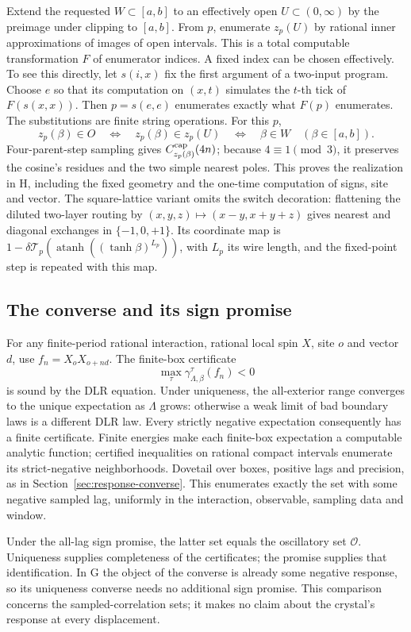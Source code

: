 Extend the requested \(W\subset[a,b]\) to an effectively open \(U\subset(0,\infty)\) by the preimage under clipping to \([a,b]\). From \(p\), enumerate \(z_p(U)\) by rational inner approximations of images of open intervals. This is a total computable transformation \(F\) of enumerator indices. A fixed index can be chosen effectively. To see this directly, let \(s(i,x)\) fix the first argument of a two-input program. Choose \(e\) so that its computation on \((x,t)\) simulates the \(t\)-th tick of \(F(s(x,x))\). Then \(p=s(e,e)\) enumerates exactly what \(F(p)\) enumerates. The substitutions are finite string operations. For this \(p\),
\[
 z_p(\beta)\in O\quad\Longleftrightarrow\quad
 z_p(\beta)\in z_p(U)\quad\Longleftrightarrow\quad\beta\in W
 \quad(\beta\in[a,b]).
\]
Four-parent-step sampling gives \(C^{\rm cap}_{z_p(\beta)}(4n)\); because \(4\equiv1\pmod3\), it preserves the cosine's residues and the two simple nearest poles. This proves the realization in H, including the fixed geometry and the one-time computation of signs, site and vector. The square-lattice variant omits the switch decoration: flattening the diluted two-layer routing by \((x,y,z)\mapsto(x-y,x+y+z)\) gives nearest and diagonal exchanges in \(\{-1,0,+1\}\). Its coordinate map is \(1-\delta\mathcal T_p(\operatorname{atanh}((\tanh\beta)^{L_p}))\), with \(L_p\) its wire length, and the fixed-point step is repeated with this map.

\subsection{The converse and its sign promise}\label{sec:decay-converse}

For any finite-period rational interaction, rational local spin \(X\), site \(o\) and vector \(d\), use
\(f_n=X_oX_{o+nd}\). The finite-box certificate
\[
 \max_\tau\gamma_{\Lambda,\beta}^\tau(f_n)<0
\]
is sound by the DLR equation. Under uniqueness, the all-exterior range converges to the unique expectation as \(\Lambda\) grows: otherwise a weak limit of bad boundary laws is a different DLR law. Every strictly negative expectation consequently has a finite certificate. Finite energies make each finite-box expectation a computable analytic function; certified inequalities on rational compact intervals enumerate its strict-negative neighborhoods. Dovetail over boxes, positive lags and precision, as in Section~\ref{sec:response-converse}. This enumerates exactly the set with some negative sampled lag, uniformly in the interaction, observable, sampling data and window.

Under the all-lag sign promise, the latter set equals the oscillatory set \(\mathcal O\). Uniqueness supplies completeness of the certificates; the promise supplies that identification. In G the object of the converse is already some negative response, so its uniqueness converse needs no additional sign promise. This comparison concerns the sampled-correlation sets; it makes no claim about the crystal's response at every displacement.
